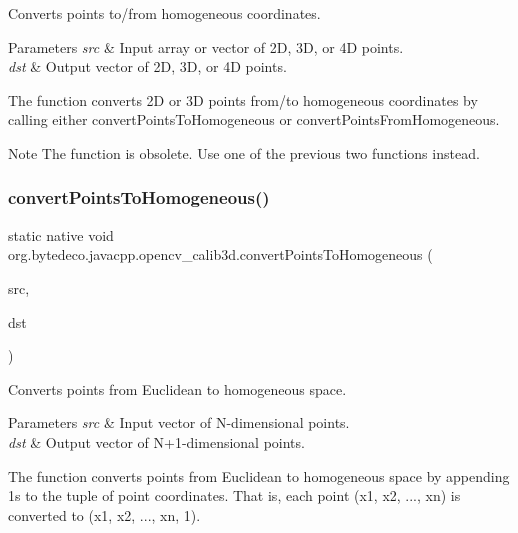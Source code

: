 Converts points to/from homogeneous coordinates. 


\begin{DoxyParams}{Parameters}
{\em src} & Input array or vector of 2D, 3D, or 4D points. \\
\hline
{\em dst} & Output vector of 2D, 3D, or 4D points. \\
\hline
\end{DoxyParams}
The function converts 2D or 3D points from/to homogeneous coordinates by calling either convert\+Points\+To\+Homogeneous or convert\+Points\+From\+Homogeneous. 

\begin{DoxyNote}{Note}
The function is obsolete. Use one of the previous two functions instead. 
\end{DoxyNote}
\mbox{\label{group__calib3d_gaaf5de214950c5c904cd996ac5f73bff6}} 
\subsubsection{\texorpdfstring{convert\+Points\+To\+Homogeneous()}{convertPointsToHomogeneous()}}
{\footnotesize\ttfamily static native void org.\+bytedeco.\+javacpp.\+opencv\+\_\+calib3d.\+convert\+Points\+To\+Homogeneous (\begin{DoxyParamCaption}\item[{@By\+Val Mat}]{src,  }\item[{@By\+Val Mat}]{dst }\end{DoxyParamCaption})\hspace{0.3cm}{\ttfamily [static]}}



Converts points from Euclidean to homogeneous space. 


\begin{DoxyParams}{Parameters}
{\em src} & Input vector of N-\/dimensional points. \\
\hline
{\em dst} & Output vector of N+1-\/dimensional points. \\
\hline
\end{DoxyParams}
The function converts points from Euclidean to homogeneous space by appending 1\textquotesingle{}s to the tuple of point coordinates. That is, each point (x1, x2, ..., xn) is converted to (x1, x2, ..., xn, 1). \mbox{\label{group__calib3d_gad0d4f7daee2c8fda384311c1bce0965a}} 
